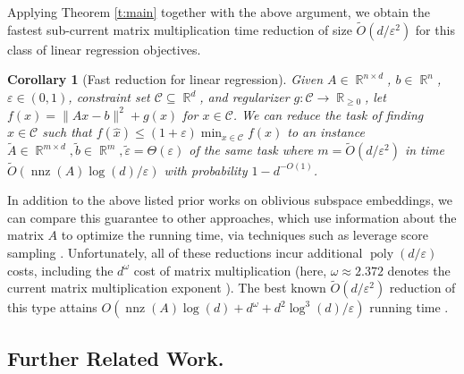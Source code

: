 \documentclass[11pt]{amsart}
\numberwithin{equation}{section}
\numberwithin{equation}{section}
\DeclareMathOperator{\R}{\mathbb{R}}
\DeclareMathOperator{\poly}{poly}
\DeclareMathOperator{\nnz}{nnz}
\newtheorem{corollary}[theorem]{Corollary}
\begin{document}
Applying Theorem \ref{t:main} together with the above argument, we obtain the fastest sub-current matrix multiplication time reduction of size $\tilde O(d/\varepsilon^2)$ for this class of linear regression objectives.

\begin{corollary}[Fast reduction for linear regression]
    Given $A\in\R^{n\times d}$, $b\in\R^n$, $\varepsilon\in(0,1)$, constraint set $\mathcal C\subseteq\R^d$, and regularizer $g:\mathcal{C}\rightarrow \R_{\geq 0}$, let $f(x) = \|Ax-b\|^2+g(x)$ for $x\in\mathcal C$. We can reduce the task of finding $\hat x\in\mathcal C$ such that $f(\hat x)\le (1+\varepsilon)\min_{x\in\mathcal C}f(x)$ to an instance $\tilde A\in\R^{m\times d},\tilde b\in\R^m, \tilde\varepsilon=\Theta(\varepsilon)$ of the same task where $m = \tilde O(d/\varepsilon^2)$ in time $\tilde O(\nnz(A)\log(d)/\varepsilon)$ with probability $1-d^{-O(1)}$.
\end{corollary}
In addition to the above listed prior works on oblivious subspace embeddings, we can compare this guarantee to other approaches, which use information about the matrix $A$ to optimize the running time, via techniques such as leverage score sampling \cite{chepurko2022near,cherapanamjeri2023optimal,chenakkod2024optimal,chenakkod2025optimal}. Unfortunately, all of these reductions incur additional $\poly(d/\varepsilon)$ costs, including the $d^\omega$ cost of matrix multiplication (here, $\omega\approx 2.372$ denotes the current matrix multiplication exponent \cite{alman2025more}). The best known $\tilde O(d/\varepsilon^2)$ reduction of this type attains $O(\nnz(A)\log(d) + d^\omega + d^2\log^3(d)/\varepsilon)$ running time \cite{chenakkod2025optimal}. 

\subsection{Further Related Work.}
\end{document}

